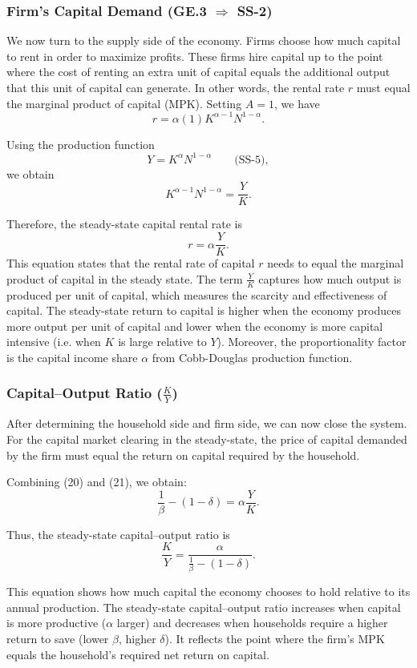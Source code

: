 \documentclass[12pt]{article}
\begin{document}
\subsubsection{Firm's Capital Demand (GE.3 $\Longrightarrow$ SS-2)}
We now turn to the supply side of the economy. Firms choose how much capital to rent in order to maximize profits. These firms hire capital up to the point where the cost of renting an extra unit of capital equals the additional output that this unit of capital can generate.
In other words, the rental rate $r$ must equal the marginal product of capital (MPK). 
Setting $A = 1$, we have
\[
r = \alpha (1) K^{\alpha - 1} N^{1 - \alpha}.
\]

Using the production function
\[
Y = K^{\alpha} N^{1-\alpha} \qquad \text{(SS-5)},
\]
we obtain
\[
K^{\alpha - 1} N^{1 - \alpha} = \frac{Y}{K}.
\]

Therefore, the steady-state capital rental rate is
\[
r = \alpha \frac{Y}{K}.
\tag{21}
\]
This equation states that the rental rate of capital $r$ needs to equal the marginal product of capital in the steady state. The term $\frac{Y}{K}$ captures how much output is produced per unit of capital, which measures the scarcity and effectiveness of capital. The steady-state return to capital is higher when the economy produces more output per unit of capital and lower when the economy is more capital intensive (i.e. when $K$ is large relative to $Y$). Moreover, the proportionality factor is the capital income share $\alpha$ from Cobb-Douglas production function. 
\subsubsection{Capital--Output Ratio ($\frac{K}{Y}$)}
After determining the household side and firm side, we can now close the system. For the capital market clearing in the steady-state, the price of capital demanded by the firm must equal the return on capital required by the household.

Combining (20) and (21), we obtain:
\[
\frac{1}{\beta} - (1-\delta)
= 
\alpha \frac{Y}{K}.
\]

Thus, the steady-state capital--output ratio is
\[
\frac{K}{Y}
=
\frac{\alpha}{\frac{1}{\beta} - (1-\delta)}.
\tag{22}
\]

This equation shows how much capital the economy chooses to hold relative to its annual production.
The steady-state capital--output ratio increases when capital is more productive ($\alpha$ larger) and decreases when households require a higher return to save (lower $\beta$, higher $\delta$). It reflects the point where the firm’s MPK equals the household’s required net return on capital.
\end{document}
